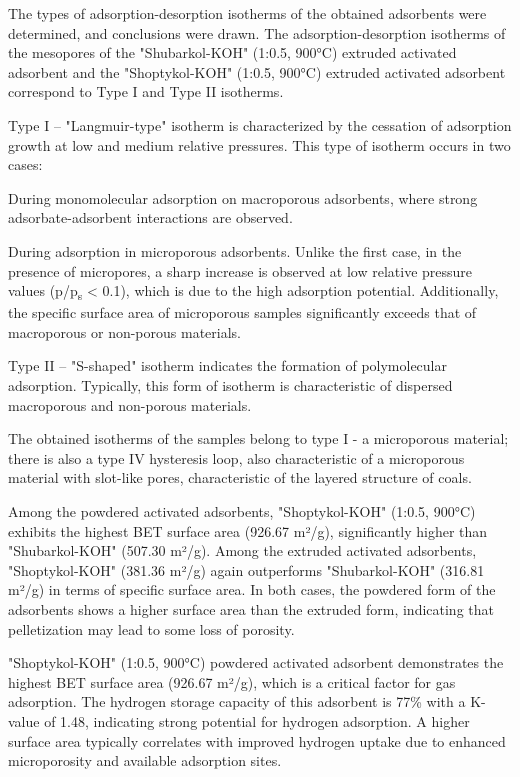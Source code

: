 \begin{multicols}{2}
The types of adsorption-desorption isotherms of the obtained adsorbents
were determined, and conclusions were drawn. The adsorption-desorption
isotherms of the mesopores of the "Shubarkol-KOH" (1:0.5, 900°C)
extruded activated adsorbent and the "Shoptykol-KOH" (1:0.5, 900°C)
extruded activated adsorbent correspond to Type I and Type II isotherms.

Type I -- "Langmuir-type" isotherm is characterized by the cessation of
adsorption growth at low and medium relative pressures. This type of
isotherm occurs in two cases:

During monomolecular adsorption on macroporous adsorbents, where strong
adsorbate-adsorbent interactions are observed.

During adsorption in microporous adsorbents. Unlike the first case, in
the presence of micropores, a sharp increase is observed at low relative
pressure values (p/p\textsubscript{s} \textless{} 0.1), which is due to
the high adsorption potential. Additionally, the specific surface area
of microporous samples significantly exceeds that of macroporous or
non-porous materials.

Type II -- "S-shaped" isotherm indicates the formation of polymolecular
adsorption. Typically, this form of isotherm is characteristic of
dispersed macroporous and non-porous materials.

The obtained isotherms of the samples belong to type I - a microporous
material; there is also a type IV hysteresis loop, also characteristic
of a microporous material with slot-like pores, characteristic of the
layered structure of coals.

Among the powdered activated adsorbents, "Shoptykol-KOH" (1:0.5, 900°C)
exhibits the highest BET surface area (926.67 m²/g), significantly
higher than "Shubarkol-KOH" (507.30 m²/g). Among the extruded activated
adsorbents, "Shoptykol-KOH" (381.36 m²/g) again outperforms
"Shubarkol-KOH" (316.81 m²/g) in terms of specific surface area. In both
cases, the powdered form of the adsorbents shows a higher surface area
than the extruded form, indicating that pelletization may lead to some
loss of porosity.

"Shoptykol-KOH" (1:0.5, 900°C) powdered activated adsorbent demonstrates
the highest BET surface area (926.67 m²/g), which is a critical factor
for gas adsorption. The hydrogen storage capacity of this adsorbent is
77\% with a K-value of 1.48, indicating strong potential for hydrogen
adsorption. A higher surface area typically correlates with improved
hydrogen uptake due to enhanced microporosity and available adsorption
sites.
\end{multicols}

